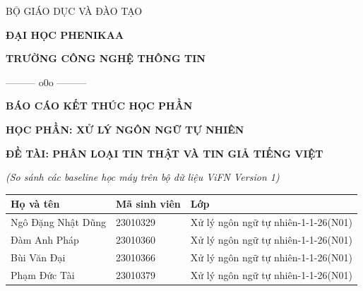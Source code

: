 \documentclass[12pt,a4paper]{report}
\begin{document}
\begin{titlepage}
\thispagestyle{empty}

\begin{center}
  {\fontsize{13pt}{15pt}\selectfont BỘ GIÁO DỤC VÀ ĐÀO TẠO\par}
  {\fontsize{14pt}{17pt}\selectfont \textbf{ĐẠI HỌC PHENIKAA}\par}
  {\fontsize{14pt}{17pt}\selectfont \textbf{TRƯỜNG CÔNG NGHỆ THÔNG TIN}\par}
  \vspace{0.4cm}
  {\fontsize{11pt}{13pt}\selectfont ——— o0o ———\par}
  \vspace{2.5cm}

  {\fontsize{17pt}{21pt}\selectfont \textbf{BÁO CÁO KẾT THÚC HỌC PHẦN}\par}
  \vspace{0.6cm}
  {\fontsize{14pt}{17pt}\selectfont \textbf{HỌC PHẦN: XỬ LÝ NGÔN NGỮ TỰ NHIÊN}\par}
  \vspace{1.0cm}
  {\fontsize{16pt}{20pt}\selectfont \textbf{ĐỀ TÀI: PHÂN LOẠI TIN THẬT VÀ TIN GIẢ TIẾNG VIỆT}\par}
  \vspace{0.4cm}
  {\fontsize{13pt}{16pt}\selectfont \textit{(So sánh các baseline học máy trên bộ dữ liệu ViFN Version 1)}\par}
  
  \vspace{2.2cm}

  \begin{tabular}{p{5.24cm} p{2.93cm} p{5.62cm}}
    \hline
    \textbf{Họ và tên} & \textbf{Mã sinh viên} & \textbf{Lớp} \\
    \hline
    Ngô Đặng Nhật Dũng & 23010329 & Xử lý ngôn ngữ tự nhiên-1-1-26(N01) \\
    Đàm Anh Pháp       & 23010360 & Xử lý ngôn ngữ tự nhiên-1-1-26(N01) \\
    Bùi Văn Đại        & 23010366 & Xử lý ngôn ngữ tự nhiên-1-1-26(N01) \\
    Phạm Đức Tài       & 23010379 & Xử lý ngôn ngữ tự nhiên-1-1-26(N01) \\
    \hline
  \end{tabular}


\end{center}
\end{titlepage}
\end{document}
